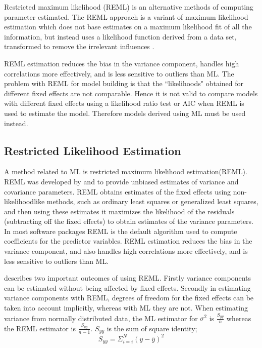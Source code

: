 \documentclass[12pt, a4paper]{report}
\theoremstyle{plain}
\theoremstyle{definition}
\theoremstyle{remark}
\begin{document}
	Restricted maximum likelihood (REML) is an alternative methods of
	computing parameter estimated. The REML approach is a variant of maximum likelihood estimation which does not base estimates on a maximum likelihood fit of all the information, but instead uses a likelihood function derived from a data set, transformed to remove the irrelevant influences \citep{REMLDefine}.
	
	REML estimation reduces the bias in the variance component, handles high correlations
	more effectively, and is less sensitive to outliers than ML.  The problem with REML for model building is that the ``likelihoods" obtained for different fixed effects are not comparable. Hence it is not valid to compare models
	with different fixed effects using a likelihood ratio test or AIC when REML is used to estimate the model. Therefore models derived using ML must be used instead.
	
	
	
	
	
	
	
	
	\subsection{Restricted Likelihood Estimation}
	
	A method related to ML is restricted maximum likelihood
	estimation(REML). REML was developed by \citet*{PT71} and
	\citet{Harville} to provide unbiased estimates of variance and
	covariance parameters. REML obtains estimates of the fixed effects
	using non-likelihoodlike methods, such as ordinary least squares
	or generalized least squares, and then using these estimates it
	maximizes the likelihood of the residuals (subtracting off the
	fixed effects) to obtain estimates of the variance parameters. In
	most software packages REML is the default algorithm used to
	compute coefficients for the predictor variables. REML estimation
	reduces the bias in the variance component, and also handles high
	correlations more effectively, and is less sensitive to outliers
	than ML.
	
	\citet{McCullSearle} describes two important outcomes of using
	REML. Firstly variance components can be estimated without being
	affected by fixed effects. Secondly in estimating variance
	components with REML, degrees of freedom for the fixed effects can
	be taken into account implicitly, whereas with ML they are not.
	When estimating variance from normally distributed data, the ML
	estimator for $\sigma^{2}$ is $\frac{S_{yy}}{n}$ whereas the REML
	estimator is $\frac{S_{yy}}{n-1}$. $S_{yy}$ is the sum of square
	identity;
	\begin{equation}
	S_{yy} = \Sigma_{i=i}^{N} (y-\bar{y})^{2}
	\end{equation}
	
\end{document}
